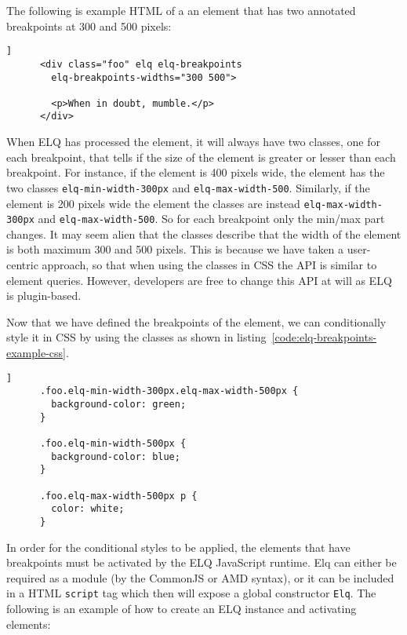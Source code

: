 \documentclass{acm_proc_article-sp}
\newcommand{\code}[1]{\texttt{#1}}
\newcommand{\elq}{ELQ}
\begin{document}
    The following is example HTML of a an element that has two annotated breakpoints at 300 and 500 pixels:

    \begin{lstlisting}[gobble=6,caption={},captionpos=b,label={}]]
      <div class="foo" elq elq-breakpoints
        elq-breakpoints-widths="300 500">
        
        <p>When in doubt, mumble.</p>
      </div>
    \end{lstlisting}

    When \elq{} has processed the element, it will always have two classes, one for each breakpoint, that tells if the size of the element is greater or lesser than each breakpoint.
    For instance, if the element is 400 pixels wide, the element has the two classes \code{elq-min-width-300px} and \code{elq-max-width-500}.
    Similarly, if the element is 200 pixels wide the element the classes are instead \code{elq-max-width-300px} and \code{elq-max-width-500}.
    So for each breakpoint only the min/max part changes.
    It may seem alien that the classes describe that the width of the element is both maximum 300 and 500 pixels.
    This is because we have taken a user-centric approach, so that when using the classes in CSS the API is similar to element queries.
    However, developers are free to change this API at will as \elq{} is plugin-based.

    Now that we have defined the breakpoints of the element, we can conditionally style it in CSS by using the classes as shown in listing~\ref{code:elq-breakpoints-example-css}.

    \begin{lstlisting}[gobble=6,caption={Example usage of the breakpoint state classes in CSS.},captionpos=b,label={code:elq-breakpoints-example-css}]]
      .foo.elq-min-width-300px.elq-max-width-500px {
        background-color: green;
      }

      .foo.elq-min-width-500px {
        background-color: blue;
      }

      .foo.elq-max-width-500px p {
        color: white;
      }
    \end{lstlisting}

    In order for the conditional styles to be applied, the elements that have breakpoints must be activated by the \elq{} JavaScript runtime.
    Elq can either be required as a module (by the CommonJS or AMD syntax), or it can be included in a HTML \code{script} tag which then will expose a global constructor \code{Elq}.
    The following is an example of how to create an \elq{} instance and activating elements:
\end{document}

